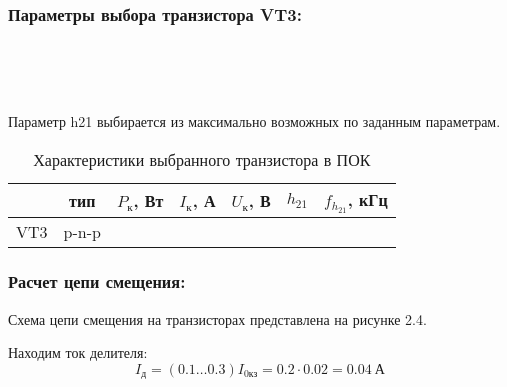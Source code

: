 \subsubsection{Параметры выбора транзистора VT3:}
\begin{equation}
\label{eq:equation3_6}

\end{equation}

\begin{equation}
\label{eq:equation3_7}

\end{equation}

\begin{equation}
\label{eq:equation3_8}

\end{equation}

\begin{equation}
\label{eq:equation3_9}

\end{equation}

\begin{equation}
\label{eq:equation3_10}

\end{equation}

Параметр h21 выбирается из максимально возможных по заданным параметрам.

\begin{table}[htbp]
\caption{Характеристики выбранного транзистора в ПОК}
\begin{center}\begin{tabular}{|c|c|c|c|c|c|c|}
\hline 
  & тип & $P_{\text{к}}$, Вт & $I_{\text{к}}$, А & $U_{\text{к}}$, В & $h_{21}$ &  $f_{h_{21}}$, кГц \\ 
\hline 
VT3 & p-n-p &   &  &  &  & \\ 
\hline 
\end{tabular} 
\end{center}
\end{table}

\subsubsection{Расчет цепи смещения:}

Схема цепи смещения на транзисторах представлена на рисунке 2.4. \par
Находим ток делителя:
\begin{equation}
\label{eq:equation3_11}
 I_{\text{д}} = (0.1 \ldots 0.3) I_{\text{0кз}} = 0.2 \cdot 0.02 = 0.04~\text{А}
\end{equation}


